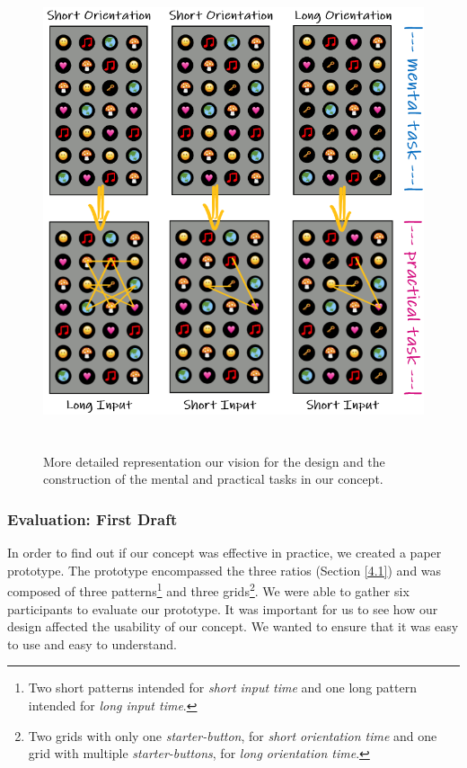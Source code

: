 \begin{figure}[t!]
\centering
\includegraphics[width=14cm, height=14cm]{Chapters/graphics/firstdraft.PNG}
\caption{More detailed representation our vision for the design and the construction of the mental and practical tasks in our concept.    }
\label{fig:firstdraft}
\end{figure}

\subsubsection{Evaluation: First Draft} \label{4.2.2.2}
In order to find out if our concept was effective in practice, we created a paper prototype. The prototype encompassed the three ratios (Section \ref{4.1}) and was composed of three patterns\footnote{Two short patterns intended for \textit{short input time} and one long pattern intended for \textit{long input time}.} and three grids\footnote{Two grids with only one \textit{starter-button}, for \textit{short orientation time} and one grid with multiple \textit{starter-buttons}, for \textit{long orientation time}.}. We were able to gather six participants to evaluate our prototype. It was important for us to see how our design affected the usability of our concept. We wanted to ensure that it was easy to use and easy to understand.

